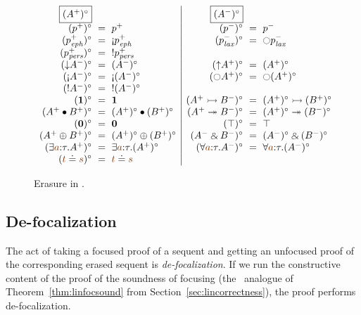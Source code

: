 \begin{figure}
{\small \[
\begin{array}{rcl|rcl}
\fbox{$(A^+)^\circ$} & & &
\fbox{$(A^-)^\circ$} & & 
\\
(p^+)^\circ & \!\!\!=\!\!\! & p^+ &
(p^-)^\circ & \!\!\!=\!\!\! & p^- \\
(p^+_\meph)^\circ & \!\!\!=\!\!\! & {\gnab}p^+_\meph &
(p^-_\mlax)^\circ & \!\!\!=\!\!\! & {\ocircle}p^-_\mlax 
\\
(p^+_\mpers)^\circ & \!\!\!=\!\!\! & {!}p^+_\mpers &
& & 
\\
({\downarrow}A^-)^\circ & \!\!\!=\!\!\! & (A^-)^\circ &
({\uparrow}A^+)^\circ & \!\!\!=\!\!\! & (A^+)^\circ 
\\
({\gnab}A^-)^\circ & \!\!\!=\!\!\! & {\gnab}(A^-)^\circ &
({\ocircle}A^+)^\circ & \!\!\!=\!\!\! & {\ocircle}(A^+)^\circ 
\\
({!}A^-)^\circ & \!\!\!=\!\!\! & {!}(A^-)^\circ &
& & 
\\
(\one)^\circ & \!\!\!=\!\!\! & \one &
(A^+ \lefti B^-)^\circ & \!\!\!=\!\!\! & (A^+)^\circ \lefti (B^+)^\circ 
\\
(A^+ \fuse B^+)^\circ & \!\!\!=\!\!\! & (A^+)^\circ \fuse (B^+)^\circ &
(A^+ \righti B^-)^\circ & \!\!\!=\!\!\! & (A^+)^\circ \righti (B^-)^\circ 
\\
(\zero)^\circ & \!\!\!=\!\!\! & \zero &
(\top)^\circ & \!\!\!=\!\!\! & \top 
\\
(A^+ \oplus B^+)^\circ & \!\!\!=\!\!\! & (A^+)^\circ \oplus (B^+)^\circ &
(A^- \with B^-)^\circ & \!\!\!=\!\!\! & (A^-)^\circ \with (B^-)^\circ 
\\
(\exists\lf a{:}\tau.A^+)^\circ & \!\!\!=\!\!\! & \exists\lf a{:}\tau. (A^+)^\circ &
(\forall\lf a{:}\tau.A^-)^\circ & \!\!\!=\!\!\! & \forall\lf a{:}\tau. (A^-)^\circ 
\\
(\lf t \doteq \lf s)^\circ & \!\!\!=\!\!\! & \lf t \doteq \lf s &
& &
\end{array}
\]}

\caption{Erasure in \ollll.}
\label{fig:ord-erasure}
\end{figure}


\subsection{De-focalization}

The act of taking a focused proof of a sequent and getting an unfocused
proof of the corresponding erased sequent is {\it de-focalization}.
If we run the constructive content of 
the proof of the soundness of focusing (the \ollll~analogue of
Theorem~\ref{thm:linfocsound} from Section~\ref{sec:lincorrectness}),
the proof performs de-focalization.

